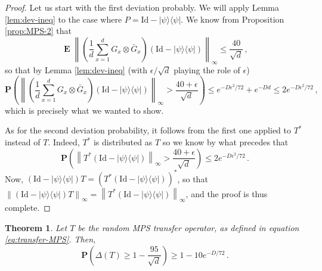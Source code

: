 \documentclass{amsart}
\newtheorem{theorem}{Theorem}[section]
\renewcommand{\P}{\mathbf{P}}
\renewcommand{\leq}{\leqslant}
\renewcommand{\geq}{\geqslant}
\newcommand{\Id}{\mathrm{Id}}
\DeclareMathOperator{\E}{\mathbf{E}}
\newcommand{\ketbra}[2]{| #1 \rangle\!\langle #2 |}
\begin{document}
\begin{proof}
    Let us start with the first deviation probably. We will apply Lemma \ref{lem:dev-ineq} to the case where $P=\Id-\ketbra{\psi}{\psi}$.
    We know from Proposition \ref{prop:MPS-2} that
    \[ \E\left\| \left(\frac{1}{d}\sum_{x=1}^dG_x\otimes\bar{G}_x\right)\left(\Id-\ketbra{\psi}{\psi}\right) \right\|_{\infty} \leq \frac{40}{\sqrt{d}} \, , \]
    so that by Lemma \ref{lem:dev-ineq} (with $\epsilon/\sqrt{d}$ playing the role of $\epsilon$)
    \[ \P\left( \left\| \left(\frac{1}{d}\sum_{x=1}^dG_x\otimes\bar{G}_x\right)\left(\Id-\ketbra{\psi}{\psi}\right) \right\|_{\infty} > \frac{40+\epsilon}{\sqrt{d}} \right) \leq e^{-D\epsilon^2/72}+e^{-Dd} \leq 2e^{-D\epsilon^2/72} \, , \]
    which is precisely what we wanted to show.

    As for the second deviation probability, it follows from the first one applied to $T^*$ instead of $T$. Indeed, $T^*$ is distributed as $T$ so we know by what precedes that
    \[ \P\left( \left\|T^*\left(\Id-\ketbra{\psi}{\psi}\right) \right\|_{\infty} > \frac{40+\epsilon}{\sqrt{d}} \right) \leq 2e^{-D\epsilon^2/72} \, . \]
    Now, $(\Id-\ketbra{\psi}{\psi})T = \left(T^*(\Id-\ketbra{\psi}{\psi})\right)^*$, so that $\left\|\left(\Id-\ketbra{\psi}{\psi}\right)T \right\|_{\infty} = \left\|T^*\left(\Id-\ketbra{\psi}{\psi}\right) \right\|_{\infty}$, and the proof is thus complete.
\end{proof}

\begin{theorem} \label{th:gap-MPS}
    Let $T$ be the random MPS transfer operator, as defined in equation \eqref{eq:transfer-MPS}. Then,
    \[ \P\left( \Delta(T) \geq 1-\frac{95}{\sqrt{d}} \right) \geq 1-10e^{-D/72} \, . \]
\end{theorem}
\end{document}
